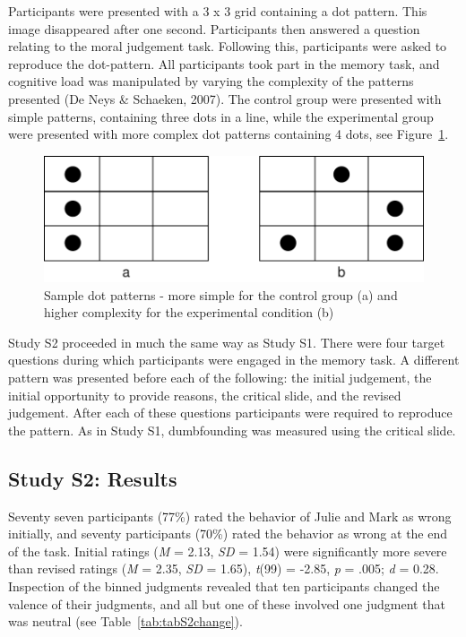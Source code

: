 \documentclass[
  american,
  man,floatsintext]{apa7}
\begin{document}
Participants were presented with a 3 x 3 grid containing a dot pattern. This image disappeared after one second. Participants then answered a question relating to the moral judgement task. Following this, participants were asked to reproduce the dot-pattern. All participants took part in the memory task, and cognitive load was manipulated by varying the complexity of the patterns presented (De Neys \& Schaeken, 2007). The control group were presented with simple patterns, containing three dots in a line, while the experimental group were presented with more complex dot patterns containing 4 dots, see Figure~\ref{fig:S2dotpattern}.

\begin{figure}[!h]
\includegraphics{Supplementary_files/figure-latex/S2dotpattern-1} \caption{Sample dot patterns - more simple for the control group (a) and higher complexity for the experimental condition (b)}\label{fig:S2dotpattern}
\end{figure}

Study S2 proceeded in much the same way as Study S1. There were four target questions during which participants were engaged in the memory task. A different pattern was presented before each of the following: the initial judgement, the initial opportunity to provide reasons, the critical slide, and the revised judgement. After each of these questions participants were required to reproduce the pattern. As in Study S1, dumbfounding was measured using the critical slide.

\hypertarget{study-s2-results}{%
\subsection{Study S2: Results}\label{study-s2-results}}

Seventy seven participants (77\%) rated the behavior of Julie and Mark as wrong initially, and seventy participants (70\%) rated the behavior as wrong at the end of the task. Initial ratings (\emph{M} = 2.13, \emph{SD} = 1.54) were significantly more severe than revised ratings (\emph{M} = 2.35, \emph{SD} = 1.65), \emph{t}(99) = -2.85, \emph{p} = .005; \emph{d} = 0.28. Inspection of the binned judgments revealed that ten participants changed the valence of their judgments, and all but one of these involved one judgment that was neutral (see Table~\ref{tab:tabS2change}).
\end{document}
